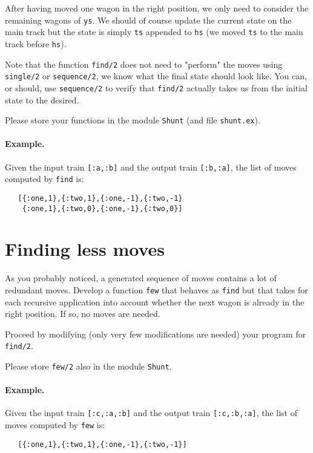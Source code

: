 \documentclass[a4paper,11pt]{article}
\begin{document}
After having moved one wagon in the right position, we only need to
consider the remaining wagons of \verb+ys+. We should of course update
the current state on the main track but the state is simply \verb+ts+
appended to \verb+hs+ (we moved \verb+ts+ to the main track before \verb+hs+).

Note that the function \verb+find/2+ does not need to "perform" the
moves using \verb+single/2+ or \verb+sequence/2+, we know what the
final state should look like. You can, or should, use \verb+sequence/2+
to verify that \verb+find/2+ actually takes us from the initial state
to the desired.

Please store your functions in the module \verb+Shunt+ (and file
\verb+shunt.ex+).

\paragraph{Example.}
Given the input train \verb+[:a,:b]+ and the output train \verb+[:b,:a]+, the
list of moves computed by \verb+find+ is:

\begin{verbatim}
   [{:one,1},{:two,1},{:one,-1},{:two,-1} 
    {:one,1},{:two,0},{:one,-1},{:two,0}]
\end{verbatim}

\section*{Finding less moves}

As you probably noticed, a generated sequence of moves contains a lot
of redundant moves. Develop a function \verb+few+ that behaves as
\verb+find+ but that takes for each recursive application into account
whether the next wagon is already in the right position. If so, no
moves are needed.

Proceed by modifying (only very few modifications are needed)
your program for \verb+find/2+.

Please store \verb+few/2+ also in the module \verb+Shunt+.

\paragraph{Example.}
Given the input train \verb+[:c,:a,:b]+ and the output train
\verb+[:c,:b,:a]+, the list of moves computed by \verb+few+ is:
\begin{verbatim}
   [{:one,1},{:two,1},{:one,-1},{:two,-1}]
\end{verbatim}
\end{document}
